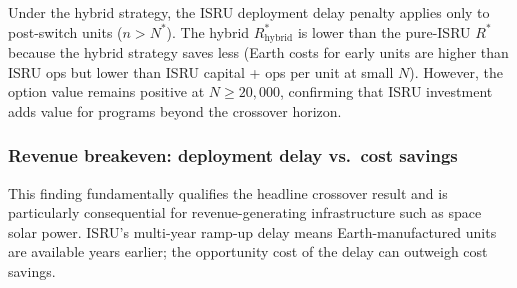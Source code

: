 \documentclass[5p,twocolumn]{elsarticle}
\begin{document}
\begin{table}[htbp]
\centering
\caption{Hybrid transition strategy: Earth for units $1$--$N^*$, ISRU for units $N^*+1$--$N$. Phased $K$ (5~yr), $r = 5\%$. Option value = Earth-only NPV $-$ hybrid NPV.}
\label{tab:hybrid}
\small
{}
\end{table}

Under the hybrid strategy, the ISRU deployment delay penalty applies only to post-switch units ($n > N^*$). The hybrid $R^*_{\mathrm{hybrid}}$ is lower than the pure-ISRU $R^*$ because the hybrid strategy saves less (Earth costs for early units are higher than ISRU ops but lower than ISRU capital + ops per unit at small $N$). However, the option value remains positive at $N \geq 20{,}000$, confirming that ISRU investment adds value for programs beyond the crossover horizon.

\subsubsection{Revenue breakeven: deployment delay vs.\ cost savings}

This finding fundamentally qualifies the headline crossover result and is particularly consequential for revenue-generating infrastructure such as space solar power. ISRU's multi-year ramp-up delay means Earth-manufactured units are available years earlier; the opportunity cost of the delay can outweigh cost savings.
\end{document}
